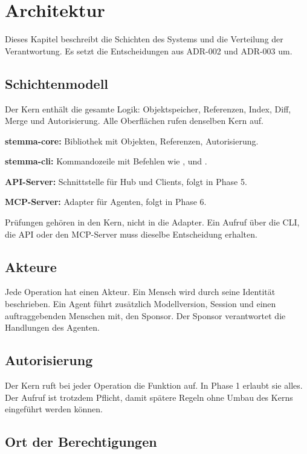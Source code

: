 \chapter{Architektur}

Dieses Kapitel beschreibt die Schichten des Systems und die Verteilung der Verantwortung. Es setzt die Entscheidungen aus ADR-002 und ADR-003 um.

\section{Schichtenmodell}

Der Kern enthält die gesamte Logik: Objektspeicher, Referenzen, Index, Diff, Merge und Autorisierung. Alle Oberflächen rufen denselben Kern auf.

\startitemize
\item \textbf{stemma-core:} Bibliothek mit Objekten, Referenzen, Autorisierung.
\item \textbf{stemma-cli:} Kommandozeile mit Befehlen wie ,  und .
\item \textbf{API-Server:} Schnittstelle für Hub und Clients, folgt in Phase 5.
\item \textbf{MCP-Server:} Adapter für Agenten, folgt in Phase 6.
\stopitemize

Prüfungen gehören in den Kern, nicht in die Adapter. Ein Aufruf über die CLI, die API oder den MCP-Server muss dieselbe Entscheidung erhalten.

\section{Akteure}

Jede Operation hat einen Akteur. Ein Mensch wird durch seine Identität beschrieben. Ein Agent führt zusätzlich Modellversion, Session und einen auftraggebenden Menschen mit, den Sponsor. Der Sponsor verantwortet die Handlungen des Agenten.

\section{Autorisierung}

Der Kern ruft bei jeder Operation die Funktion  auf. In Phase 1 erlaubt sie alles. Der Aufruf ist trotzdem Pflicht, damit spätere Regeln ohne Umbau des Kerns eingeführt werden können.

\section{Ort der Berechtigungen}

